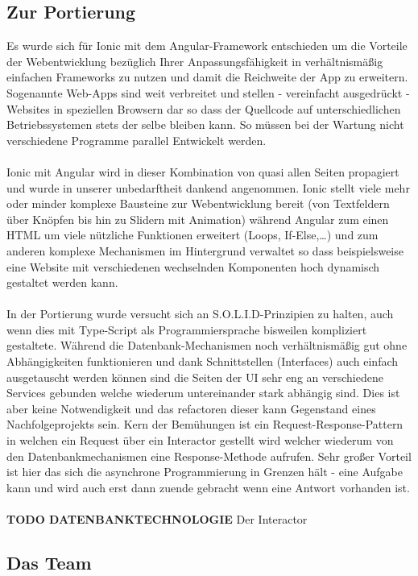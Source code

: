\subsection{Zur Portierung}
Es wurde sich für Ionic mit dem Angular-Framework entschieden um die Vorteile der Webentwicklung bezüglich Ihrer Anpassungsfähigkeit in verhältnismäßig einfachen Frameworks zu nutzen und damit die Reichweite der App zu erweitern. Sogenannte \glqq Web-Apps\grqq{} sind weit verbreitet und stellen - vereinfacht ausgedrückt - Websites in speziellen Browsern dar so dass der Quellcode auf unterschiedlichen Betriebssystemen stets der selbe bleiben kann. So müssen bei der Wartung nicht verschiedene Programme parallel Entwickelt werden.\\\\
Ionic mit Angular wird in dieser Kombination von quasi allen Seiten propagiert und wurde in unserer unbedarftheit dankend angenommen. Ionic stellt viele mehr oder minder komplexe Bausteine zur Webentwicklung bereit (von Textfeldern über Knöpfen bis hin zu Slidern mit Animation) während Angular zum einen HTML um viele nützliche \glqq Funktionen\grqq{} erweitert (Loops, If-Else,\dots) und zum anderen komplexe Mechanismen im Hintergrund verwaltet so dass beispielsweise eine Website mit verschiedenen wechselnden Komponenten hoch dynamisch gestaltet werden kann.\\\\
In der Portierung wurde versucht sich an S.O.L.I.D-Prinzipien zu halten, auch wenn dies mit Type-Script als Programmiersprache bisweilen kompliziert gestaltete. Während die Datenbank-Mechanismen noch verhältnismäßig gut ohne Abhängigkeiten funktionieren und dank Schnittstellen (Interfaces) auch einfach ausgetauscht werden können sind die Seiten der UI sehr eng an verschiedene \glqq Services\grqq{} gebunden welche wiederum untereinander stark abhängig sind. Dies ist aber keine Notwendigkeit und das refactoren dieser kann Gegenstand eines Nachfolgeprojekts sein. Kern der Bemühungen ist ein \glqq Request-Response\grqq -Pattern in welchen ein Request über ein Interactor gestellt wird welcher wiederum von den Datenbankmechanismen eine Response-Methode aufrufen. Sehr großer Vorteil ist hier das sich die asynchrone Programmierung in Grenzen hält - eine Aufgabe kann und wird auch erst dann zuende gebracht wenn eine Antwort vorhanden ist.\\\\
\textbf{TODO DATENBANKTECHNOLOGIE}
Der Interactor
\subsection{Das Team}
